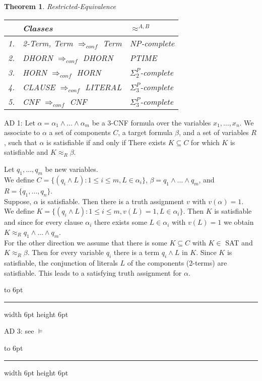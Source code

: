 \documentclass[12pt]{article}
\newtheorem{theorem}{Theorem}[section]
\newenvironment{proof}{\parindent=0pt{\bf Proof: }}{
   \hspace*{\fill}\hbox to 6pt{\leaders\hrule width 6pt height 6pt\hfill}\par}
\begin{document}
\begin{theorem}
Restricted-Equivalence\\

\begin{tabular}{|l|l|l|}
\hline
 & {\em Classes} &  $\approx^{A,B}$\\ \hline
1. & 2-Term, Term $\Rightarrow_{conf}$ Term & NP-complete \\ \hline
2. & DHORN $\Rightarrow_{conf}$ DHORN & PTIME \\ \hline
3. & HORN $\Rightarrow_{conf}$ HORN & $\Sigma_2^P$-complete \\ \hline
4. & CLAUSE $\Rightarrow_{conf}$ LITERAL &  $\Sigma_3^P$-complete\\ \hline
5. & CNF $\Rightarrow_{conf}$ CNF & $\Sigma_3^P$-complete\\ \hline
\end{tabular}
\end{theorem}
\vspace*{5mm}
\begin{proof}
AD 1:  Let $\alpha = \alpha_1 \wedge \ldots \wedge \alpha_m$ be a 3-CNF formula over the variables $x_1, \ldots, x_n$. We associate
to $\alpha$ a set of components $C$, a target formula $\beta$, and a set of variables $R$, such that $\alpha$ is satisfiable if and only if
There exists $K \subseteq C$ for which $K$ is satisfiable and $K \approx_R\beta$.

Let $q_1, \ldots, q_m$ be new variables.\\
We define $C=\{(q_i \wedge L) : 1 \leq i \leq m, L \in \alpha_i\}$, $\beta = q_1 \wedge \ldots \wedge q_m$, and
$R=\{q_1, \ldots, q_n\}$.\\
Suppose, $\alpha$ is satisfiable. Then there is a truth assignment $v$ with $v(\alpha)=1$.\\
We define $K = \{(q_i \wedge L) : 1 \leq i \leq m, v(L)=1, L \in \alpha_i\}$. Then $K$ is satisfiable and since
for every clause $\alpha_i$ there exists some $L \in \alpha_i$ with $v(L)=1$ we obtain $K \approx_R q_1 \wedge \ldots \wedge q_m$.\\
For the other direction we assume that there is some $K \subseteq C$ with $K \in$ SAT and $K \approx_R \beta$.
Then for every variable $q_i$ there is a term $q_i \wedge L$ in $K$. Since $K$ is satisfiable, the conjunction of literals $L$ of the components (2-terms) are satisfiable. This leads to a satisfying truth assignment for $\alpha$.
\end{proof}

\begin{proof}
AD 3: see $\models$
\end{proof}
\end{document}
